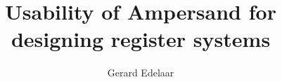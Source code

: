 \documentclass{ou-report-af}
\begin{document}
\pagestyle{plain}
\title{Usability of Ampersand for designing register systems} 
\begin{comment}
Bruikbaarheid van Ampersand voor het ontwerpen van registersystemen.
\end{comment}
\author{Gerard Edelaar}


\newpage


\newpage


\let\cleardoublepage\clearpage












%

\newpage
\newpage
\printglossary







%
\end{document}
